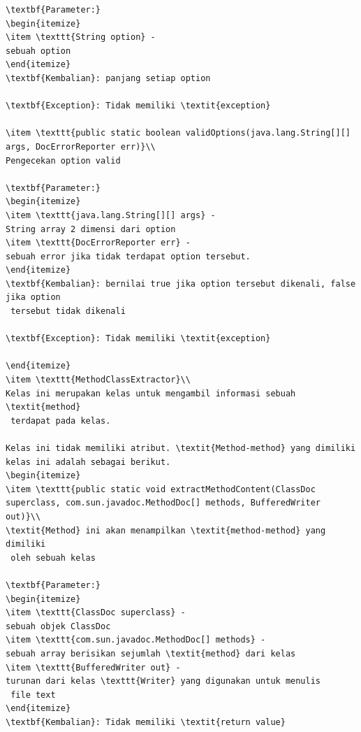 \documentclass[a4paper,twoside]{article}
\begin{document}
\begin{enumerate}
\begin{lstlisting}[caption=Hasil Pengujian Kedua]
\textbf{Parameter:}
\begin{itemize}
\item \texttt{String option} - 
sebuah option
\end{itemize}
\textbf{Kembalian}: panjang setiap option

\textbf{Exception}: Tidak memiliki \textit{exception}

\item \texttt{public static boolean validOptions(java.lang.String[][] args, DocErrorReporter err)}\\ 
Pengecekan option valid

\textbf{Parameter:}
\begin{itemize}
\item \texttt{java.lang.String[][] args} - 
String array 2 dimensi dari option
\item \texttt{DocErrorReporter err} - 
sebuah error jika tidak terdapat option tersebut.
\end{itemize}
\textbf{Kembalian}: bernilai true jika option tersebut dikenali, false jika option
 tersebut tidak dikenali

\textbf{Exception}: Tidak memiliki \textit{exception}

\end{itemize}
\item \texttt{MethodClassExtractor}\\ 
Kelas ini merupakan kelas untuk mengambil informasi sebuah \textit{method}
 terdapat pada kelas.

Kelas ini tidak memiliki atribut. \textit{Method-method} yang dimiliki kelas ini adalah sebagai berikut.
\begin{itemize}
\item \texttt{public static void extractMethodContent(ClassDoc superclass, com.sun.javadoc.MethodDoc[] methods, BufferedWriter out)}\\ 
\textit{Method} ini akan menampilkan \textit{method-method} yang dimiliki
 oleh sebuah kelas

\textbf{Parameter:}
\begin{itemize}
\item \texttt{ClassDoc superclass} - 
sebuah objek ClassDoc
\item \texttt{com.sun.javadoc.MethodDoc[] methods} - 
sebuah array berisikan sejumlah \textit{method} dari kelas
\item \texttt{BufferedWriter out} - 
turunan dari kelas \texttt{Writer} yang digunakan untuk menulis
 file text
\end{itemize}
\textbf{Kembalian}: Tidak memiliki \textit{return value}


\end{lstlisting}
\end{enumerate}
\end{document}
